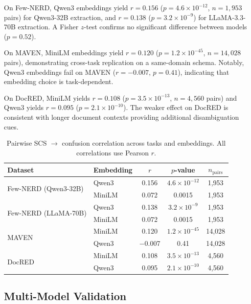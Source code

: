 \documentclass[11pt,a4paper]{article}
\begin{document}
On Few-NERD, Qwen3 embeddings yield $r{=}0.156$ ($p{=}4.6{\times}10^{-12}$, $n{=}1{,}953$ pairs) for Qwen3-32B extraction, and $r{=}0.138$ ($p{=}3.2{\times}10^{-9}$) for LLaMA-3.3-70B extraction.
A Fisher $z$-test confirms no significant difference between models ($p{=}0.52$).

On MAVEN, MiniLM embeddings yield $r{=}0.120$ ($p{=}1.2{\times}10^{-45}$, $n{=}14{,}028$ pairs), demonstrating cross-task replication on a same-domain schema.
Notably, Qwen3 embeddings fail on MAVEN ($r{=}{-}0.007$, $p{=}0.41$), indicating that embedding choice is task-dependent.

On DocRED, MiniLM yields $r{=}0.108$ ($p{=}3.5{\times}10^{-13}$, $n{=}4{,}560$ pairs) and Qwen3 yields $r{=}0.095$ ($p{=}2.1{\times}10^{-10}$).
The weaker effect on DocRED is consistent with longer document contexts providing additional disambiguation cues.

\begin{table}[t]
\centering
\small
\caption{Pairwise SCS $\to$ confusion correlation across tasks and embeddings. All correlations use Pearson $r$.}
\label{tab:pairwise-cross}
\begin{tabular}{llccc}
\toprule
Dataset & Embedding & $r$ & $p$-value & $n_{\text{pairs}}$ \\
\midrule
\multirow{2}{*}{Few-NERD (Qwen3-32B)} & Qwen3  & 0.156 & $4.6{\times}10^{-12}$ & 1,953 \\
                                        & MiniLM & 0.072 & 0.0015 & 1,953 \\
\midrule
\multirow{2}{*}{Few-NERD (LLaMA-70B)}  & Qwen3  & 0.138 & $3.2{\times}10^{-9}$ & 1,953 \\
                                        & MiniLM & 0.072 & 0.0015 & 1,953 \\
\midrule
\multirow{2}{*}{MAVEN}                 & MiniLM & 0.120 & $1.2{\times}10^{-45}$ & 14,028 \\
                                        & Qwen3  & $-$0.007 & 0.41 & 14,028 \\
\midrule
\multirow{2}{*}{DocRED}                & MiniLM & 0.108 & $3.5{\times}10^{-13}$ & 4,560 \\
                                        & Qwen3  & 0.095 & $2.1{\times}10^{-10}$ & 4,560 \\
\bottomrule
\end{tabular}
\end{table}

\subsection{Multi-Model Validation}
\label{sec:multimodel}
\end{document}
